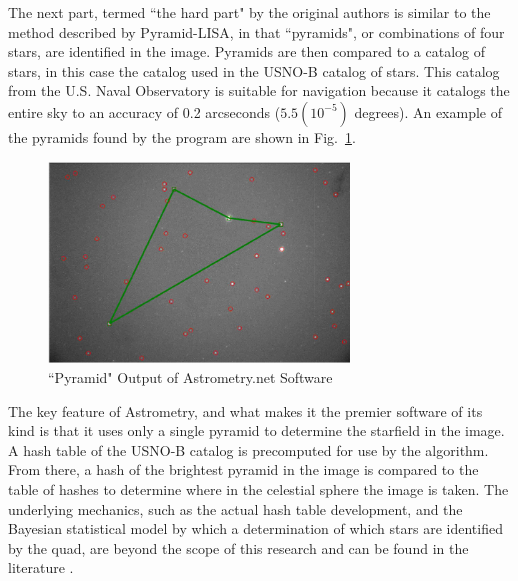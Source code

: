 \documentclass[12pt,a4paper]{book}
\begin{document}
\FloatBarrier
The next part, termed ``the hard part" by the original authors is similar to the method described by Pyramid-LISA, in that ``pyramids", or combinations of four stars, are identified in the image.  Pyramids are then compared to a catalog of stars, in this case the catalog used in the USNO-B catalog of stars.  This catalog from the U.S. Naval Observatory is suitable for navigation because it catalogs the entire sky to an accuracy of 0.2 arcseconds ($5.5(10^{-5})$ degrees).   An example of the pyramids found by the program are shown in Fig.~\ref{f:pyramids}.  
\begin{figure}[!ht]%
\centering
 \includegraphics[width=8cm]{pyramids.png}
 \caption{``Pyramid" Output of Astrometry.net Software}
\label{f:pyramids}
\end{figure} 

The key feature of Astrometry, and what makes it the premier software of its kind is that it uses only a single pyramid to determine the starfield in the image.  A hash table of the USNO-B catalog is precomputed for use by the algorithm.  From there, a hash of the brightest pyramid in the image is compared to the table of hashes to determine where in the celestial sphere the image is taken.  The underlying mechanics, such as the actual hash table development, and the Bayesian statistical model by which a determination of which stars are identified by the quad, are beyond the scope of this research and can be found in the literature \cite{b:lang2}.  
\end{document}
